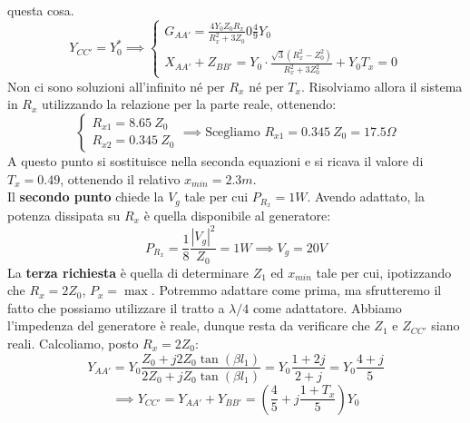 \documentclass{book}
\begin{document}
        questa cosa. \\
        \begin{equation}
            Y_{CC'} = Y_{0} ^{*} \implies 
            \begin{cases}
                G_{AA'} = \displaystyle \frac{4Y_{0}Z_{0}R_{x}}{R_{x} ^{2}+3Z_{0}} 0 \frac{4}{9}Y_{0} \\
                X_{AA'}+Z_{BB'} = Y_{0} \cdot \displaystyle \frac{\sqrt{3}(R_{x} ^{2}-Z_{0} ^{2})}{R_{x} ^{2}+3Z_{0} ^{2}} +Y_{0}T_{x} = 0
            \end{cases}
        \end{equation}
        Non ci sono soluzioni all'infinito né per $R_{x}$ né per $T_{x}$. Risolviamo allora il sistema in $R_{x}$
        utilizzando la relazione per la parte reale, ottenendo:
        \begin{equation}
            \begin{cases}
                R_{x1} = 8.65\ Z_{0} \\
                R_{x2} = 0.345\ Z_{0}
            \end{cases} \implies \textrm{Scegliamo }R_{x1} = 0.345\ Z_{0} =17.5 \Omega
        \end{equation}
        A questo punto si sostituisce nella seconda equazioni e si ricava il valore di $T_{x}=0.49$, ottenendo 
        il relativo $x_{min}=2.3m$. \\
        Il \textbf{secondo punto} chiede la $V_{g}$ tale per cui $P_{R_{x}}=1W$. Avendo adattato, la potenza dissipata
        su $R_{x}$ è quella disponibile al generatore:
        \begin{equation}
            P_{R_{x}} = \frac{1}{8}\frac{|V_{g}|^{2}}{Z_{0}} = 1W \implies V_{g} = 20V
        \end{equation}
        La \textbf{terza richiesta} è quella di determinare $Z_{1}$ ed $x_{min}$ tale per cui, ipotizzando che $R_{x} = 2Z_{0}$,  $P_{x} = \max$.
        Potremmo adattare come prima, ma sfrutteremo il fatto che possiamo utilizzare il tratto a $\lambda/4$ come adattatore. Abbiamo l'impedenza del 
        generatore è reale, dunque resta da verificare che $Z_{1}$ e $Z_{CC'}$ siano reali.
        Calcoliamo, posto $R_{x}=2Z_{0}$:
        \begin{equation}
            Y_{AA'} = Y_{0} \frac{Z_{0}+j2Z_{0}\tan(\beta l_{1})}{2Z_{0}+jZ_{0}\tan(\beta l_{1})} = Y_{0} \frac{1+2j}{2+j} = Y_{0}\frac{4+j}{5}
        \end{equation}
        \begin{equation}
            \implies Y_{CC'}=Y_{AA'}+Y_{BB'} = (\frac{4}{5}+j\frac{1+T_{x}}{5})Y_{0}
        \end{equation}
\end{document}
